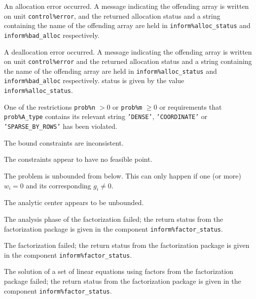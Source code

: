 \documentclass{galahad}
\begin{document}
\begin{description}

 An allocation error occurred. 
A message indicating the offending 
array is written on unit {\tt control\%error}, and the returned allocation 
status and a string containing the name of the offending array
are held in {\tt inform\%alloc\_\-status}
and {\tt inform\%bad\_alloc} respectively.

 A deallocation error occurred. 
A message indicating the offending 
array is written on unit {\tt control\%error} and the returned allocation 
status and a string containing the name of the offending array
are held in {\tt inform\%alloc\_\-status}
and {\tt inform\%bad\_alloc} respectively.
status is given by the value {\tt inform\%alloc\_status}.

One of the restrictions {\tt prob\%n} $> 0$ or {\tt prob\%m} $\geq  0$
    or requirements that {\tt prob\%A\_type} contains its relevant string
    {\tt 'DENSE'}, {\tt 'COORDINATE'}  or {\tt 'SPARSE\_BY\_ROWS'} 
    has been violated.


 The bound constraints are inconsistent.

 The constraints appear to have no feasible point.

 The problem is unbounded from below. 
This can only happen if
one (or more) $w_i = 0$ and its corresponding $g_i \neq 0$.

 The analytic center appears to be unbounded.

 The analysis phase of the factorization failed; 
 the return status from the factorization
    package is given in the component {\tt inform\%fac\-t\-or\_status}.

 The factorization failed; 
 the return status from the factorization
    package is given in the component {\tt inform\%fac\-t\-or\_status}.

 The solution of a set of linear equations 
 using factors from the factorization package failed; 
 the return status from the factorization
    package is given in the component {\tt inform\%fac\-t\-or\_status}.


\end{description}
\end{document}
